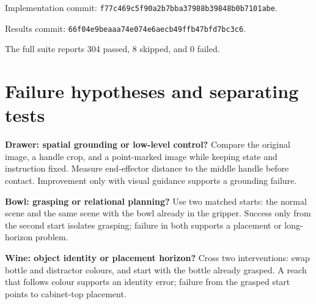 \documentclass[10pt]{extarticle}
\newcommand{\sha}[1]{\nolinkurl{#1}}
\begin{document}
Implementation commit:
\sha{f77c469c5f90a2b7bba37988b39848b0b7101abe}.\par
Results commit:
\sha{66f04e9beaaa74e074e6aecb49ffb47bfd7bc3c6}.\par
The full suite reports 304 passed, 8 skipped, and 0 failed.

\section{Failure hypotheses and separating tests}
\label{app:failure-tests}
\textbf{Drawer: spatial grounding or low-level control?}
Compare the original image, a handle crop, and a point-marked image while
keeping state and instruction fixed. Measure end-effector distance to the
middle handle before contact. Improvement only with visual guidance supports
a grounding failure.

\textbf{Bowl: grasping or relational planning?}
Use two matched starts: the normal scene and the same scene with the bowl
already in the gripper. Success only from the second start isolates grasping;
failure in both supports a placement or long-horizon problem.

\textbf{Wine: object identity or placement horizon?}
Cross two interventions: swap bottle and distractor colours, and start with
the bottle already grasped. A reach that follows colour supports an identity
error; failure from the grasped start points to cabinet-top placement.

\clearpage
\end{document}
